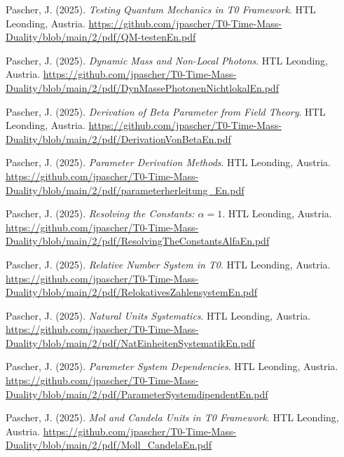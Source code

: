 \documentclass{article}
\begin{document}
\begin{thebibliography}{99}
		Pascher, J. (2025).
		\textit{Testing Quantum Mechanics in T0 Framework}.
		HTL Leonding, Austria.
		\url{https://github.com/jpascher/T0-Time-Mass-Duality/blob/main/2/pdf/QM-testenEn.pdf}
		
		Pascher, J. (2025).
		\textit{Dynamic Mass and Non-Local Photons}.
		HTL Leonding, Austria.
		\url{https://github.com/jpascher/T0-Time-Mass-Duality/blob/main/2/pdf/DynMassePhotonenNichtlokalEn.pdf}
		
		
		Pascher, J. (2025).
		\textit{Derivation of Beta Parameter from Field Theory}.
		HTL Leonding, Austria.
		\url{https://github.com/jpascher/T0-Time-Mass-Duality/blob/main/2/pdf/DerivationVonBetaEn.pdf}
		
		Pascher, J. (2025).
		\textit{Parameter Derivation Methods}.
		HTL Leonding, Austria.
		\url{https://github.com/jpascher/T0-Time-Mass-Duality/blob/main/2/pdf/parameterherleitung_En.pdf}
		
		Pascher, J. (2025).
		\textit{Resolving the Constants: $\alpha = 1$}.
		HTL Leonding, Austria.
		\url{https://github.com/jpascher/T0-Time-Mass-Duality/blob/main/2/pdf/ResolvingTheConstantsAlfaEn.pdf}
		
		Pascher, J. (2025).
		\textit{Relative Number System in T0}.
		HTL Leonding, Austria.
		\url{https://github.com/jpascher/T0-Time-Mass-Duality/blob/main/2/pdf/RelokativesZahlensystemEn.pdf}
		
		Pascher, J. (2025).
		\textit{Natural Units Systematics}.
		HTL Leonding, Austria.
		\url{https://github.com/jpascher/T0-Time-Mass-Duality/blob/main/2/pdf/NatEinheitenSystematikEn.pdf}
		
		Pascher, J. (2025).
		\textit{Parameter System Dependencies}.
		HTL Leonding, Austria.
		\url{https://github.com/jpascher/T0-Time-Mass-Duality/blob/main/2/pdf/ParameterSystemdipendentEn.pdf}
		
		Pascher, J. (2025).
		\textit{Mol and Candela Units in T0 Framework}.
		HTL Leonding, Austria.
		\url{https://github.com/jpascher/T0-Time-Mass-Duality/blob/main/2/pdf/Moll_CandelaEn.pdf}
		
		

\end{thebibliography}
\end{document}
